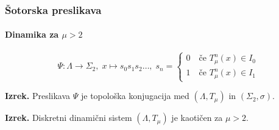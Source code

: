 \documentclass[12pt]{beamer}
\begin{document}
\begin{frame}
\frametitle{Šotorska preslikava}
\framesubtitle{Dinamika za $\mu > 2$}

\begin{equation*}
    \Psi: \Lambda \rightarrow \Sigma_2, \; x \mapsto s_0 s_1 s_2 \dots, \; s_n =
    \begin{cases}
        0 \quad \text{če } T_{\mu}^n(x) \in I_0 \\
        1 \quad \text{če } T_{\mu}^n(x) \in I_1
    \end{cases}
\end{equation*}

\bigskip

\textbf{Izrek.}
Preslikava $\Psi$ je topološka konjugacija med $(\Lambda, T_\mu)$ in $(\Sigma_2, \sigma)$.

\bigskip

\textbf{Izrek.}
Diskretni dinamični sistem $(\Lambda, T_\mu)$ je kaotičen za $\mu > 2$.

\end{frame}
\end{document}
